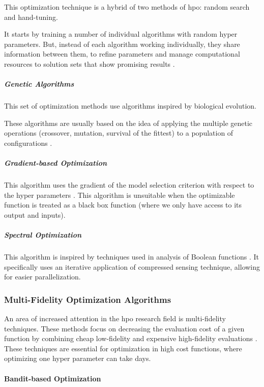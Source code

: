 This optimization technique is a hybrid of two methods of \acrshort{hpo}: random search and hand-tuning.

It starts by training a number of individual algorithms with random hyper parameters. But, instead of each algorithm working individually, they share information between them, to refine parameters and manage computational resources to solution sets that show promising results \parencite{jaderberg2017population}.

\subparagraph{Genetic Algorithms}

This set of optimization methods use algorithms inspired by biological evolution.

These algorithms are usually based on the idea of applying the multiple genetic operations (crossover, mutation, survival of the fittest) to a population of configurations \parencite{elshawi2019automated}.

\subparagraph{Gradient-based Optimization}

This algorithm uses the gradient of the model selection criterion with respect to the hyper parameters \parencite{bengio2000}. This algorithm is unsuitable when the optimizable function is treated as a black box function (where we only have access to  its output and inputs).

\subparagraph{Spectral Optimization}

This algorithm is inspired by techniques used in analysis of Boolean functions \parencite{hazan2017hyperparameter}. It specifically uses an iterative application of compressed sensing technique, allowing for easier parallelization.

\subsubsection{Multi-Fidelity Optimization Algorithms}

An area of increased attention in the \acrshort{hpo} research field is multi-fidelity techniques. These methods focus on decreasing the evaluation cost of a given function by combining cheap low-fidelity and expensive high-fidelity evaluations \parencite{elshawi2019automated}. These techniques are essential for optimization in high cost functions, where optimizing one hyper parameter can take days.

\paragraph{Bandit-based Optimization}

